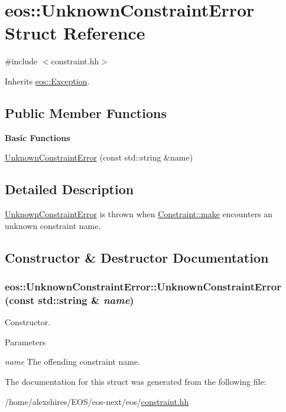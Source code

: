 \hypertarget{structeos_1_1UnknownConstraintError}{
\section{eos::UnknownConstraintError Struct Reference}
\label{structeos_1_1UnknownConstraintError}
}


{\ttfamily \#include $<$constraint.hh$>$}

Inherits \hyperlink{classeos_1_1Exception}{eos::Exception}.\subsection*{Public Member Functions}
\begin{Indent}{\bf Basic Functions}\par
{\em \label{_amgrp2386c9a1f1785edee33f374dd2db9b3d}
 }\begin{DoxyCompactItemize}
\item 
\hyperlink{structeos_1_1UnknownConstraintError_a17699ee52aac3c7ec6316ad8335e04a0}{UnknownConstraintError} (const std::string \&name)
\end{DoxyCompactItemize}
\end{Indent}


\subsection{Detailed Description}
\hyperlink{structeos_1_1UnknownConstraintError}{UnknownConstraintError} is thrown when \hyperlink{classeos_1_1Constraint_a5084265f8e196296a885089cf710c096}{Constraint::make} encounters an unknown constraint name. 

\subsection{Constructor \& Destructor Documentation}
\hypertarget{structeos_1_1UnknownConstraintError_a17699ee52aac3c7ec6316ad8335e04a0}{
\subsubsection[{UnknownConstraintError}]{\setlength{\rightskip}{0pt plus 5cm}eos::UnknownConstraintError::UnknownConstraintError (const std::string \& {\em name})}}
\label{structeos_1_1UnknownConstraintError_a17699ee52aac3c7ec6316ad8335e04a0}
Constructor.


\begin{DoxyParams}{Parameters}
\item[{\em name}]The offending constraint name. \end{DoxyParams}


The documentation for this struct was generated from the following file:\begin{DoxyCompactItemize}
\item 
/home/alexshires/EOS/eos-\/next/eos/\hyperlink{constraint_8hh}{constraint.hh}\end{DoxyCompactItemize}
